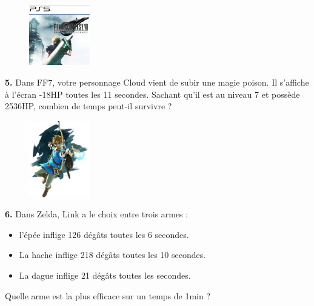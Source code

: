 \Pointilles[7]

\begin{minipage}[t]{0.25\textwidth}
  \begin{figure}[H]
    \centering
    \includegraphics[width=100px]{4x1-nombres-relatifs/ex2.jpg}
  \end{figure}
\end{minipage}
\begin{minipage}[t]{0.75\textwidth}
  \textbf{5.} Dans FF7, votre personnage Cloud vient de subir une magie poison. Il s'affiche à l'écran -18HP toutes les 11 secondes. Sachant qu'il est au niveau 7 et possède 2536HP, combien de temps peut-il survivre ?\\
  \Pointilles[6]
\end{minipage}

\Pointilles[3]

\begin{minipage}[t]{0.25\textwidth}
  \begin{figure}[H]
    \centering
    \includegraphics[width=100px]{4x1-nombres-relatifs/ex3.jpg}
  \end{figure}
\end{minipage}
\begin{minipage}[t]{0.75\textwidth}
  \textbf{6.} Dans Zelda, Link a le choix entre trois armes : 
  \begin{itemize}
    \item l'épée inflige 126 dégâts toutes les 6 secondes.
    \item La hache inflige 218 dégâts toutes les 10 secondes.
    \item La dague inflige 21 dégâts toutes les secondes.
  \end{itemize}
  Quelle arme est la plus efficace sur un temps de 1min ?\\
  \Pointilles[5]
\end{minipage}

\Pointilles[3]

